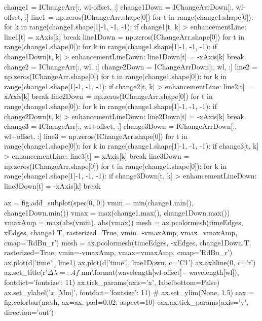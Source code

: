 \begin{pycode}[2DRT]
    change1 = IChangeArr[:, wl-offset, :]
    change1Down = IChangeArrDown[:, wl-offset, :]
    line1 = np.zeros(IChangeArr.shape[0])
    for t in range(change1.shape[0]):
        for k in range(change1.shape[1]-1, -1, -1):
            if change1[t, k] > enhancementLine:
                line1[t] = xAxis[k]
                break
    line1Down = np.zeros(IChangeArr.shape[0])
    for t in range(change1.shape[0]):
        for k in range(change1.shape[1]-1, -1, -1):
            if change1Down[t, k] > enhancementLineDown:
                line1Down[t] = -xAxis[k]
                break
    change2 = IChangeArr[:, wl, :]
    change2Down = IChangeArrDown[:, wl, :]
    line2 = np.zeros(IChangeArr.shape[0])
    for t in range(change1.shape[0]):
        for k in range(change1.shape[1]-1, -1, -1):
            if change2[t, k] > enhancementLine:
                line2[t] = xAxis[k]
                break
    line2Down = np.zeros(IChangeArr.shape[0])
    for t in range(change1.shape[0]):
        for k in range(change1.shape[1]-1, -1, -1):
            if change2Down[t, k] > enhancementLineDown:
                line2Down[t] = -xAxis[k]
                break
    change3 = IChangeArr[:, wl+offset, :]
    change3Down = IChangeArrDown[:, wl+offset, :]
    line3 = np.zeros(IChangeArr.shape[0])
    for t in range(change1.shape[0]):
        for k in range(change1.shape[1]-1, -1, -1):
            if change3[t, k] > enhancementLine:
                line3[t] = xAxis[k]
                break
    line3Down = np.zeros(IChangeArr.shape[0])
    for t in range(change1.shape[0]):
        for k in range(change1.shape[1]-1, -1, -1):
            if change3Down[t, k] > enhancementLineDown:
                line3Down[t] = -xAxis[k]
                break

    ax = fig.add_subplot(spec[0, 0])
    vmin = min(change1.min(), change1Down.min())
    vmax = max(change1.max(), change1Down.max())
    vmaxAmp = max(abs(vmin), abs(vmax))
    mesh = ax.pcolormesh(timeEdges, xEdges, change1.T, rasterized=True, vmin=-vmaxAmp, vmax=vmaxAmp, cmap='RdBu_r')
    mesh = ax.pcolormesh(timeEdges, -xEdges, change1Down.T, rasterized=True, vmin=-vmaxAmp, vmax=vmaxAmp, cmap='RdBu_r')
    ax.plot(d['time'], line1)
    ax.plot(d['time'], line1Down, c='C1')
    ax.axhline(0, c='r')
    ax.set_title(r'$\Delta\lambda={:.4f}$ nm'.format(wavelength[wl-offset] - wavelength[wl]), fontdict={'fontsize': 11})
    ax.tick_params(axis='x', labelbottom=False)
    ax.set_ylabel('$x$ [Mm]', fontdict={'fontsize': 11})
#     ax.set_ylim(None, 1.5)
    cax = fig.colorbar(mesh, ax=ax, pad=0.02, aspect=10)
    cax.ax.tick_params(axis='y', direction='out')


\end{pycode}
